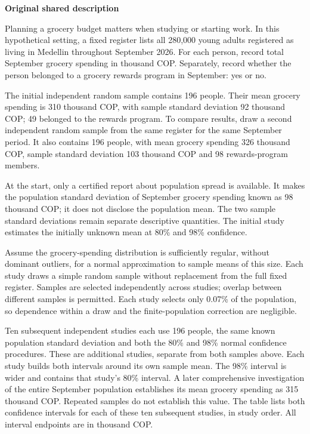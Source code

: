 \secInicio

\clearpage


\textbf{Original shared description}

Planning a grocery budget matters when studying or starting work. In this hypothetical setting, a fixed register lists all 280,000 young adults registered as living in Medellin throughout September 2026. For each person, record total September grocery spending in thousand COP. Separately, record whether the person belonged to a grocery rewards program in September: yes or no.

The initial independent random sample contains 196 people. Their mean grocery spending is 310 thousand COP, with sample standard deviation 92 thousand COP; 49 belonged to the rewards program. To compare results, draw a second independent random sample from the same register for the same September period. It also contains 196 people, with mean grocery spending 326 thousand COP, sample standard deviation 103 thousand COP and 98 rewards-program members.

At the start, only a certified report about population spread is available. It makes the population standard deviation of September grocery spending known as 98 thousand COP; it does not disclose the population mean. The two sample standard deviations remain separate descriptive quantities. The initial study estimates the initially unknown mean at 80\% and 98\% confidence.

Assume the grocery-spending distribution is sufficiently regular, without dominant outliers, for a normal approximation to sample means of this size. Each study draws a simple random sample without replacement from the full fixed register. Samples are selected independently across studies; overlap between different samples is permitted. Each study selects only 0.07\% of the population, so dependence within a draw and the finite-population correction are negligible.

Ten subsequent independent studies each use 196 people, the same known population standard deviation and both the 80\% and 98\% normal confidence procedures. These are additional studies, separate from both samples above. Each study builds both intervals around its own sample mean. The 98\% interval is wider and contains that study's 80\% interval. A later comprehensive investigation of the entire September population establishes its mean grocery spending as 315 thousand COP. Repeated samples do not establish this value. The table lists both confidence intervals for each of these ten subsequent studies, in study order. All interval endpoints are in thousand COP.

